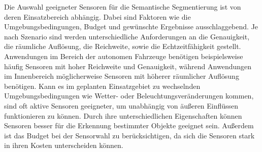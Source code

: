Die Auswahl geeigneter Sensoren für die Semantische Segmentierung ist von deren
Einsatzbereich abhängig. Dabei sind Faktoren wie die Umgebungsbedingungen,
Budget und gewünschte Ergebnisse ausschlaggebend. Je nach Szenario sind werden
unterschiedliche Anforderungen an die Genauigkeit, die räumliche Auflösung, die
Reichweite, sowie die Echtzeitfähigkeit gestellt. Anwendungen im Bereich der
autonomen Fahrzeuge benötigen beispielsweise häufig Sensoren mit hoher
Reichweite und Genauigkeit, während Anwendungen im Innenbereich möglicherweise
Sensoren mit höherer räumlicher Auflösung benötigen. Kann es im geplanten
Einsatzgebiet zu wechselnden Umgebungsbedingungen wie Wetter- oder
Beleuchtungsveränderungen kommen, sind oft aktive Sensoren geeigneter, um
unabhängig von äußeren Einflüssen funktionieren zu können. Durch ihre
unterschiedlichen Eigenschaften können Sensoren besser für die Erkennung
bestimmter Objekte geeignet sein. Außerdem ist das Budget bei der Sensorwahl zu
berücksichtigen, da sich die Sensoren stark in ihren Kosten unterscheiden
können.\cite{20222324}
